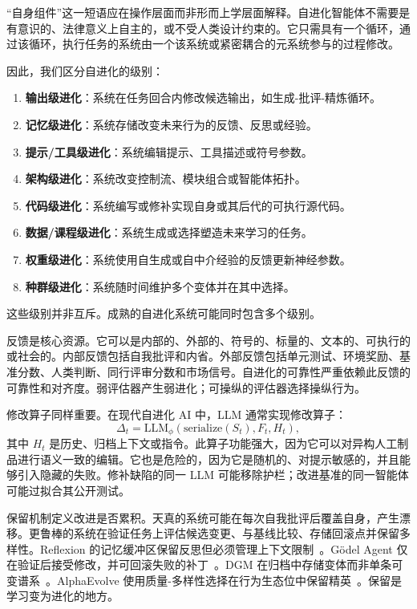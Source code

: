 ``自身组件''这一短语应在操作层面而非形而上学层面解释。自进化智能体不需要是有意识的、法律意义上自主的，或不受人类设计约束的。它只需具有一个循环，通过该循环，执行任务的系统由一个该系统或紧密耦合的元系统参与的过程修改。

因此，我们区分自进化的级别：

\begin{enumerate}
    \item \textbf{输出级进化}：系统在任务回合内修改候选输出，如生成-批评-精炼循环。
    \item \textbf{记忆级进化}：系统存储改变未来行为的反馈、反思或经验。
    \item \textbf{提示/工具级进化}：系统编辑提示、工具描述或符号参数。
    \item \textbf{架构级进化}：系统改变控制流、模块组合或智能体拓扑。
    \item \textbf{代码级进化}：系统编写或修补实现自身或其后代的可执行源代码。
    \item \textbf{数据/课程级进化}：系统生成或选择塑造未来学习的任务。
    \item \textbf{权重级进化}：系统使用自生成或自中介经验的反馈更新神经参数。
    \item \textbf{种群级进化}：系统随时间维护多个变体并在其中选择。
\end{enumerate}

这些级别并非互斥。成熟的自进化系统可能同时包含多个级别。

反馈是核心资源。它可以是内部的、外部的、符号的、标量的、文本的、可执行的或社会的。内部反馈包括自我批评和内省。外部反馈包括单元测试、环境奖励、基准分数、人类判断、同行评审分数和市场信号。自进化的可靠性严重依赖此反馈的可靠性和对齐度。弱评估器产生弱进化；可操纵的评估器选择操纵行为。

修改算子同样重要。在现代自进化 AI 中，LLM 通常实现修改算子：
\begin{equation}
\Delta_t = \mathrm{LLM}_{\phi}(\mathrm{serialize}(S_t), F_t, H_t),
\end{equation}
其中 $H_t$ 是历史、归档上下文或指令。此算子功能强大，因为它可以对异构人工制品进行语义一致的编辑。它也是危险的，因为它是随机的、对提示敏感的，并且能够引入隐藏的失败。修补缺陷的同一 LLM 可能移除护栏；改进基准的同一智能体可能过拟合其公开测试。

保留机制定义改进是否累积。天真的系统可能在每次自我批评后覆盖自身，产生漂移。更鲁棒的系统在验证任务上评估候选变更、与基线比较、存储回滚点并保留多样性。Reflexion 的记忆缓冲区保留反思但必须管理上下文限制~\citep{reflexion2023}。G\"{o}del Agent 仅在验证后接受修改，并可回滚失败的补丁~\citep{godelagent2024}。DGM 在归档中存储变体而非单条可变谱系~\citep{darwingodelmachine2025}。AlphaEvolve 使用质量-多样性选择在行为生态位中保留精英~\citep{alphaevolve2025}。保留是学习变为进化的地方。

